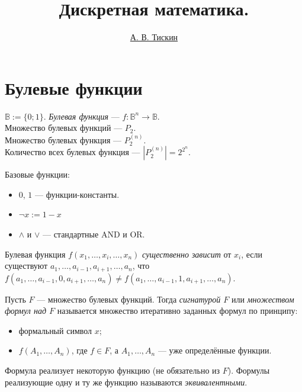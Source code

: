 \documentclass[12pt,a4paper]{article}
\title{Дискретная математика.}
\author{\href{mailto:alextiskin@gmail.com}{А. В. Тискин}}
\date{}
\newcommand{\BB}[1][]{\ensuremath{\mathbb{B}#1}\xspace}
\begin{document}
    \maketitle

    \listoftodos[TODOs]

    \tableofcontents

    \section{Булевые функции}

    \begin{definition}
        $\BB := \{0; 1\}$. \emph{Булевая функция} --- $f: \BB^n \to \BB$.\\
        Множество булевых функций --- $P_2$.\\
        Множество булевых функция --- $P^{(n)}_2$.\\
        Количество всех булевых функция --- $\left|P^{(n)}_2\right|=2^{2^n}$.
    \end{definition}

    \begin{definition}
        Базовые функции:
        \begin{itemize}
            \item $0$, $1$ --- функции-константы.
            \item $\neg x := 1-x$
            \item $\wedge$ и $\vee$ --- стандартные AND и OR. 
        \end{itemize}
    \end{definition}

    \begin{definition}
        Булевая функция $f(x_1, \dots, x_i, \dots, x_n)$ \emph{существенно зависит} от $x_i$, если существуют $a_1, \dots, a_{i-1}, a_{i+1}, \dots, a_n$, что $f(a_1, \dots, a_{i-1}, 0, a_{i+1}, \dots, a_n) \neq f(a_1, \dots, a_{i-1}, 1, a_{i+1}, \dots, a_n)$.
    \end{definition}

    \begin{definition}
        Пусть $F$ --- множество булевых функций. Тогда \emph{сигнатурой $F$} или \emph{множеством формул над $F$} называется множество итеративно заданных формул по принципу:
        \begin{itemize}
            \item формальный символ $x$;
            \item $f(A_1, \dots, A_n)$, где $f\in F$, а $A_1, \dots, A_n$ --- уже определённые функции.
        \end{itemize}

        Формула реализует некоторую функцию (не обязательно из $F$). Формулы реализующие одну и ту же функцию называются \emph{эквивалентными}.
    \end{definition}
\end{document}
